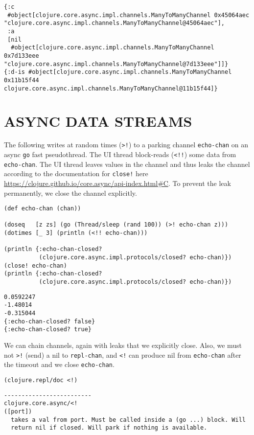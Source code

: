 \documentclass[10pt,oneside,x11names]{article}
\begin{document}
\begin{verbatim}
{:c
 #object[clojure.core.async.impl.channels.ManyToManyChannel 0x45064aec "clojure.core.async.impl.channels.ManyToManyChannel@45064aec"],
 :a
 [nil
  #object[clojure.core.async.impl.channels.ManyToManyChannel 0x7d133eee "clojure.core.async.impl.channels.ManyToManyChannel@7d133eee"]]}
{:d-is #object[clojure.core.async.impl.channels.ManyToManyChannel 0x11b15f44 clojure.core.async.impl.channels.ManyToManyChannel@11b15f44]}
\end{verbatim}

\section{ASYNC DATA STREAMS}
\label{async-data-streams}
The following writes at random times (\texttt{>!}) to a parking channel
\texttt{echo-chan} on an async \texttt{go} fast pseudothread. The UI thread
block-reads (\texttt{<!!}) some data from \texttt{echo-chan}. The UI thread leaves
values in the channel and thus leaks the channel according to the
documentation for \texttt{close!} here
\url{https://clojure.github.io/core.async/api-index.html\#C}. To prevent the
leak permanently, we close the channel explicitly.

\begin{verbatim}
(def echo-chan (chan))

(doseq   [z zs] (go (Thread/sleep (rand 100)) (>! echo-chan z)))
(dotimes [_ 3] (println (<!! echo-chan)))

(println {:echo-chan-closed?
          (clojure.core.async.impl.protocols/closed? echo-chan)})
(close! echo-chan)
(println {:echo-chan-closed?
          (clojure.core.async.impl.protocols/closed? echo-chan)})
\end{verbatim}

\begin{verbatim}
0.0592247
-1.48014
-0.315044
{:echo-chan-closed? false}
{:echo-chan-closed? true}
\end{verbatim}


We can chain channels, again with leaks that we explicitly close. Also, we must
not \texttt{>!} (send) a nil to \texttt{repl-chan}, and \texttt{<!} can produce nil from \texttt{echo-chan}
after the timeout and we close \texttt{echo-chan}.

\begin{verbatim}
(clojure.repl/doc <!)
\end{verbatim}

\begin{verbatim}
-------------------------
clojure.core.async/<!
([port])
  takes a val from port. Must be called inside a (go ...) block. Will
  return nil if closed. Will park if nothing is available.
\end{verbatim}
\end{document}
